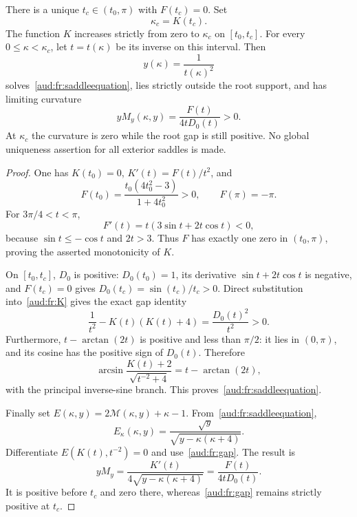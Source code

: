 \begin{proposition}\label{aud:fr:branch}
There is a unique $t_c\in(t_0,\pi)$ with $F(t_c)=0$. Set
\[
 \kappa_c=K(t_c).
\]
The function $K$ increases strictly from zero to $\kappa_c$ on $[t_0,t_c]$. For every $0\le\kappa<\kappa_c$, let $t=t(\kappa)$ be its inverse on this interval. Then
\begin{equation}\label{aud:fr:parametric}
 y(\kappa)=\frac1{t(\kappa)^2}
\end{equation}
solves~\eqref{aud:fr:saddleequation}, lies strictly outside the root support, and has limiting curvature
\begin{equation}\label{aud:fr:curvaturelimit}
 yM_y(\kappa,y)=\frac{F(t)}{4tD_0(t)}>0.
\end{equation}
At $\kappa_c$ the curvature is zero while the root gap is still positive. No global uniqueness assertion for all exterior saddles is made.
\end{proposition}
\begin{proof}
One has $K(t_0)=0$, $K'(t)=F(t)/t^2$, and
\[
 F(t_0)=\frac{t_0(4t_0^2-3)}{1+4t_0^2}>0,\qquad F(\pi)=-\pi.
\]
For $3\pi/4<t<\pi$,
\[
 F'(t)=t(3\sin t+2t\cos t)<0,
\]
because $\sin t\le-\cos t$ and $2t>3$. Thus $F$ has exactly one zero in $(t_0,\pi)$, proving the asserted monotonicity of $K$.

On $[t_0,t_c]$, $D_0$ is positive: $D_0(t_0)=1$, its derivative $\sin t+2t\cos t$ is negative, and $F(t_c)=0$ gives $D_0(t_c)=\sin(t_c)/t_c>0$. Direct substitution into~\eqref{aud:fr:K} gives the exact gap identity
\begin{equation}\label{aud:fr:gap}
 \frac1{t^2}-K(t)(K(t)+4)
 =\frac{D_0(t)^2}{t^2}>0.
\end{equation}
Furthermore, $t-\arctan(2t)$ is positive and less than $\pi/2$: it lies in $(0,\pi)$, and its cosine has the positive sign of $D_0(t)$. Therefore
\[
 \arcsin\frac{K(t)+2}{\sqrt{t^{-2}+4}}
 =t-\arctan(2t),
\]
with the principal inverse-sine branch. This proves~\eqref{aud:fr:saddleequation}.

Finally set $E(\kappa,y)=2\mathcal M(\kappa,y)+\kappa-1$. From~\eqref{aud:fr:saddleequation},
\[
 E_\kappa(\kappa,y)=\frac{\sqrt y}{\sqrt{y-\kappa(\kappa+4)}}.
\]
Differentiate $E(K(t),t^{-2})=0$ and use~\eqref{aud:fr:gap}. The result is
\[
 yM_y=\frac{K'(t)}{4\sqrt{y-\kappa(\kappa+4)}}
      =\frac{F(t)}{4tD_0(t)}.
\]
It is positive before $t_c$ and zero there, whereas~\eqref{aud:fr:gap} remains strictly positive at $t_c$.
\end{proof}

